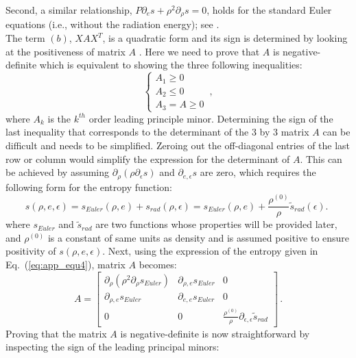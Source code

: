 \documentclass[review]{elsarticle}
\newcommand{\eqt}[1]{Eq.~(\ref{#1})}                     %
\begin{document}
\begin{appendices}
Second, a similar relationship, $P \partial_e s + \rho^2 \partial_{\rho} s = 0$, holds for the standard Euler equations (i.e., without the radiation energy); see \cite{jlg}. \\
The term $(b)$, $XAX^T$, is a quadratic form and its sign is determined by looking at the positiveness of matrix $A$ \cite{Evans}. Here we need to prove that $A$ is negative-definite which is equivalent to showing the three following inequalities:
\begin{equation}
 \left\{
 \begin{array}{ccc}
 A_1 \geq 0 \\
 A_2 \leq 0 \\
 A_3 = A \geq 0
 \end{array}
 \right. \,,
 \end{equation}
 where $A_k$ is the $k^{th}$ order leading principle minor. Determining the sign of the last inequality that corresponds to the determinant of the $3$ by $3$ matrix $A$ can be difficult and needs to be simplified. Zeroing out the off-diagonal entries of the last row or column would simplify the expression for the determinant of $A$. This can be achieved by assuming $\partial_{\rho}(\rho \partial_{\epsilon} s)$ and $\partial_{e, \epsilon} s$ are zero, which requires the following form for the entropy function:
\begin{equation}
\label{eq:app_equ4}
s(\rho, e, \epsilon) = s_{Euler}(\rho,e) + s_{rad}(\rho, \epsilon) = s_{Euler}(\rho,e) + \frac{\rho^{(0)}}{\rho}\tilde{s}_{rad}(\epsilon) \text{. } 
\end{equation}
where $s_{Euler}$ and $\tilde{s}_{rad}$ are two functions whose properties will be provided later, and $\rho^{(0)}$ is a constant of same units as density and is assumed positive to ensure positivity of $s(\rho,e,\epsilon)$.
Next, using the expression of the entropy given in \eqt{eq:app_equ4}, matrix $A$ becomes:
 \begin{equation}
 A = 
 \left[
 \begin{array}{ccc}
\partial_{\rho} \left( \rho^2 \partial_{\rho} s_{Euler} \right) & \partial_{\rho,e} s_{Euler} & 0 \\
 \partial_{\rho,e} s_{Euler} & \partial_{e,e} s_{Euler} & 0 \\
 0 & 0 & \frac{\rho^{(0)}}{\rho} \partial_{\epsilon,\epsilon} \tilde{s}_{rad}
 \end{array}
 \right]  \,.
 \end{equation}
 Proving that the matrix $A$ is  negative-definite is now straightforward by inspecting the sign of the leading principal minors:

\end{appendices}
\end{document}
